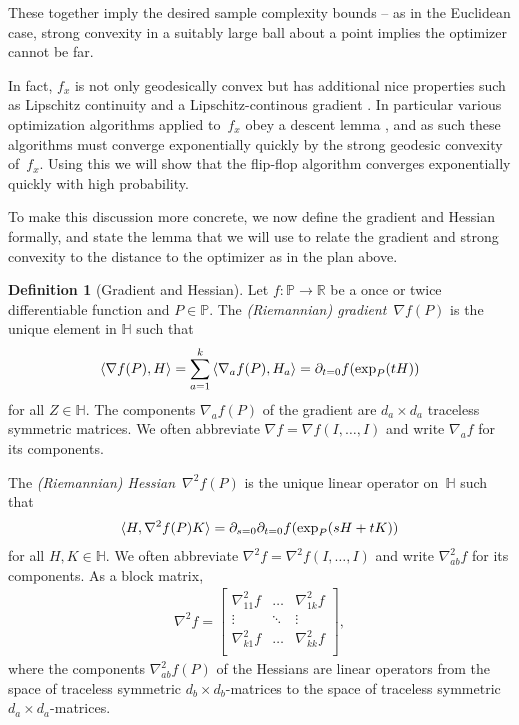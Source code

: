 \documentclass[aos]{imsart}
\theoremstyle{definition}
\newtheorem{definition}[theorem]{Definition}
\numberwithin{equation}{section}
\newcommand{\R}{{\mathbb{R}}}
\renewcommand{\P}{{\mathbb{P}}}
\renewcommand{\H}{{\mathbb{H}}}
\newcommand{\samp}{x}
\begin{document}
These together imply the desired sample complexity bounds -- as in the Euclidean case, strong convexity in a suitably large ball about a point implies the optimizer cannot be far.

In fact, $f_x$ is not only geodesically convex but has additional nice properties such as Lipschitz continuity and a Lipschitz-continous gradient \citep{burgisser2019towards}.
In particular various optimization algorithms applied to~$f_\samp$ obey a descent lemma \citep{burgisser2017alternating}, and as such these algorithms must converge exponentially quickly by the strong geodesic convexity of~$f_\samp$.
Using this we will show that the flip-flop algorithm converges exponentially quickly with high probability.

To make this discussion more concrete, we now define the gradient and Hessian formally, and state the lemma that we will use to relate the gradient and strong convexity to the distance to the optimizer as in the plan above.

\begin{definition}[Gradient and Hessian]
Let $f\colon \P \to \R$ be a once or twice differentiable function and $P \in \P$.
The \emph{(Riemannian) gradient}~$\nabla f(P)$ is the unique element in $\H$ such that
\begin{align*}
  \braket{\nabla f(P), H} = \sum_{a=1}^k \braket{\nabla_a f(P), H_a} = \partial_{t=0} f(\exp_P(tH))
\end{align*}
for all $Z\in \H$.
The components $\nabla_a f(P)$ of the gradient are $d_a \times d_a$ traceless symmetric matrices.
We often abbreviate $\nabla f = \nabla f(I,\dots,I)$ and write $\nabla_a f$ for its components.

The \emph{(Riemannian) Hessian}~$\nabla^2 f(P)$ is the unique linear operator on~$\H$ such that
\begin{align*}
  \braket{H, \nabla^2 f(P) K}
= \partial_{s=0} \partial_{t=0} f(\exp_{P}(sH + tK))
\end{align*}
for all $H,K \in \H$.
We often abbreviate $\nabla^2 f = \nabla^2 f(I,\dots,I)$ and write $\nabla^2_{ab}f$ for its components.
As a block matrix,
\begin{align*}
  \nabla^2 f = \begin{bmatrix}
  \nabla_{11}^2 f & \dots & \nabla_{1k}^2 f \\
  \vdots & \ddots & \vdots \\
  \nabla_{k1}^2 f & \dots & \nabla_{kk}^2 f \\
  \end{bmatrix},
\end{align*}
where the components $\nabla_{ab}^2f(P)$ of the Hessians are linear operators from the space of traceless symmetric $d_b\times d_b$-matrices to the space of traceless symmetric $d_a \times d_a$-matrices.
\end{definition}
\end{document}
